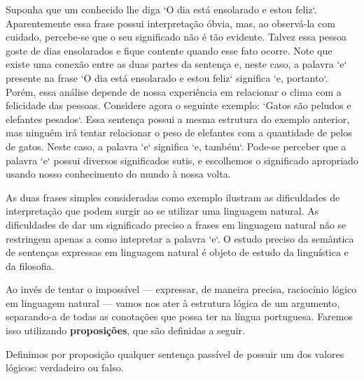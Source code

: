 Suponha que um conhecido lhe diga `O dia est\'a ensolarado e estou feliz`. Aparentemente essa frase possui interpreta\c{c}\~ao
\'obvia, mas, ao observ\'a-la com cuidado, percebe-se que o seu significado n\~ao \'e t\~ao evidente. Talvez essa pessoa goste
de dias ensolarados e fique contente quando esse fato ocorre. Note que existe uma conex\~ao entre as duas partes da senten\c{c}a e, neste caso,
a palavra `e` presente na frase `O dia est\'a ensolarado e estou feliz` significa `e, portanto`. Por\'em, essa an\'alise
depende de nossa experi\^encia em relacionar o clima com a felicidade das pessoas. Considere agora o seguinte exemplo:
`Gatos s\~ao peludos e elefantes pesados`. Essa senten\c{c}a possui a mesma estrutura do exemplo anterior, mas ningu\'em ir\'a tentar
relacionar o peso de elefantes com a quantidade de pelos de gatos. Neste caso, a palavra `e` significa `e, tamb\'em`. Pode-se perceber que a
palavra `e` possui diversos significados sutis, e escolhemos o significado apropriado usando nosso conhecimento do mundo \`a nossa volta.

As duas frases simples consideradas como exemplo ilustram as dificuldades de interpreta\c{c}\~ao que podem surgir ao se utilizar
uma linguagem natural. As dificuldades de dar um significado preciso a frases em linguagem natural n\~ao se restringem apenas a como
intepretar a palavra `e`. O estudo preciso da sem\^antica de senten\c{c}as expressas em linguagem natural \'e objeto de estudo da lingu\'istica
e da filosofia.

Ao inv\'es de tentar o imposs\'ivel --- expressar, de maneira precisa,  racioc\'inio l\'ogico em linguagem natural  --- vamos nos ater à  estrutura l\'ogica de um argumento, separando-a de todas as conota\c{c}\~oes que possa ter na l\'ingua portuguesa. Faremos isso utilizando \textbf{proposi\c{c}\~oes}, que s\~ao definidas a seguir.

\begin{Definition}[Proposi\c{c}\~ao]
  Definimos por proposi\c{c}\~ao qualquer senten\c{c}a pass\'ivel de possuir um dos valores l\'ogicos: verdadeiro ou falso.
\end{Definition}


